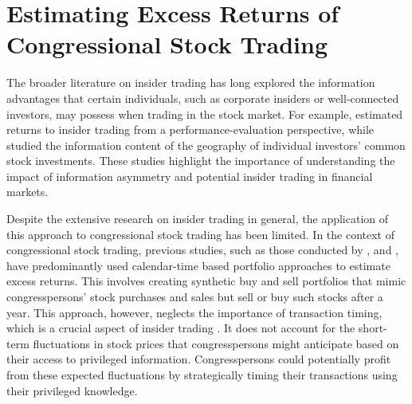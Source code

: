 \documentclass[15pt,letterpaper]{article}
\begin{document}


\section{Estimating Excess Returns of Congressional Stock Trading\protect\footnotemark} \label{ex-r}

The broader literature on insider trading has long explored the information advantages that certain individuals, such as corporate insiders or well-connected investors, may possess when trading in the stock market. For example, \cite{jeng2003} estimated returns to insider trading from a performance-evaluation perspective, while \cite{ivkovic2005} studied the information content of the geography of individual investors' common stock investments. These studies highlight the importance of understanding the impact of information asymmetry and potential insider trading in financial markets.

Despite the extensive research on insider trading in general, the application of this approach to congressional stock trading has been limited. In the context of congressional stock trading, previous studies, such as those conducted by \cite{zi24}, \cite{zi11} and \cite{eg13}, have predominantly used calendar-time based portfolio approaches \citep{hdz07} to estimate excess returns. This involves creating synthetic buy and sell portfolios \citep{syn1,syn2} that mimic congresspersons' stock purchases and sales but sell or buy such stocks after a year. 
  This approach, however, neglects the importance of transaction timing, which is a crucial aspect of insider trading \citep{tahoun2014,schweizer2011}. It does not account for the short-term fluctuations in stock prices that congresspersons might anticipate based on their access to privileged information. Congresspersons could potentially profit from these expected fluctuations by strategically timing their transactions using their privileged knowledge. 
\end{document}
